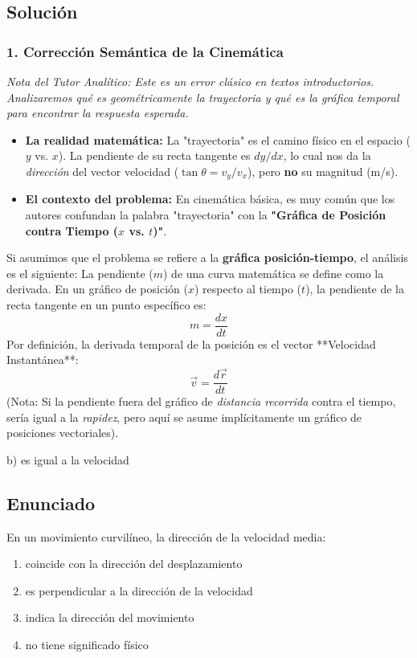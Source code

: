 \documentclass[12pt, a4paper]{article}
\begin{document}
\subsection*{Solución}

\subsubsection*{1. Corrección Semántica de la Cinemática}
\textit{Nota del Tutor Analítico: Este es un error clásico en textos introductorios. Analizaremos qué es geométricamente la trayectoria y qué es la gráfica temporal para encontrar la respuesta esperada.}

\begin{itemize}
    \item \textbf{La realidad matemática:} La "trayectoria" es el camino físico en el espacio ($y$ vs. $x$). La pendiente de su recta tangente es $dy/dx$, lo cual nos da la \textit{dirección} del vector velocidad ($\tan \theta = v_y/v_x$), pero \textbf{no} su magnitud (m/s). 
    \item \textbf{El contexto del problema:} En cinemática básica, es muy común que los autores confundan la palabra "trayectoria" con la \textbf{"Gráfica de Posición contra Tiempo ($x$ vs. $t$)"}.
\end{itemize}

Si asumimos que el problema se refiere a la \textbf{gráfica posición-tiempo}, el análisis es el siguiente:
La pendiente ($m$) de una curva matemática se define como la derivada. En un gráfico de posición ($x$) respecto al tiempo ($t$), la pendiente de la recta tangente en un punto específico es:
$$ m = \frac{dx}{dt} $$
Por definición, la derivada temporal de la posición es el vector **Velocidad Instantánea**:
$$ \vec{v} = \frac{d\vec{r}}{dt} $$
(Nota: Si la pendiente fuera del gráfico de \textit{distancia recorrida} contra el tiempo, sería igual a la \textit{rapidez}, pero aquí se asume implícitamente un gráfico de posiciones vectoriales).

\begin{tcolorbox}[colback=green!5!white, colframe=green!50!black, title=Respuesta Final]
\centering \Large b) es igual a la velocidad
\end{tcolorbox}

\newpage

\subsection*{Enunciado}
En un movimiento curvilíneo, la dirección de la velocidad media:
\begin{enumerate}[label=\alph*)]
    \item coincide con la dirección del desplazamiento
    \item es perpendicular a la dirección de la velocidad
    \item indica la dirección del movimiento
    \item no tiene significado físico
\end{enumerate}
\end{document}
